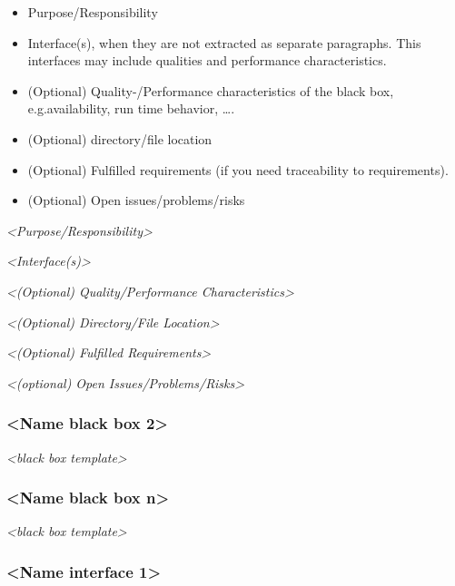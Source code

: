 \documentclass[
]{article}
\begin{document}
\begin{itemize}
\item
  Purpose/Responsibility
\item
  Interface(s), when they are not extracted as separate paragraphs. This
  interfaces may include qualities and performance characteristics.
\item
  (Optional) Quality-/Performance characteristics of the black box,
  e.g.availability, run time behavior, \ldots.
\item
  (Optional) directory/file location
\item
  (Optional) Fulfilled requirements (if you need traceability to
  requirements).
\item
  (Optional) Open issues/problems/risks
\end{itemize}

\emph{\textless Purpose/Responsibility\textgreater{}}

\emph{\textless Interface(s)\textgreater{}}

\emph{\textless(Optional) Quality/Performance
Characteristics\textgreater{}}

\emph{\textless(Optional) Directory/File Location\textgreater{}}

\emph{\textless(Optional) Fulfilled Requirements\textgreater{}}

\emph{\textless(optional) Open Issues/Problems/Risks\textgreater{}}

\hypertarget{__name_black_box_2}{%
\subsubsection{\textless Name black box
2\textgreater{}}\label{__name_black_box_2}}

\emph{\textless black box template\textgreater{}}

\hypertarget{__name_black_box_n}{%
\subsubsection{\textless Name black box
n\textgreater{}}\label{__name_black_box_n}}

\emph{\textless black box template\textgreater{}}

\hypertarget{__name_interface_1}{%
\subsubsection{\textless Name interface
1\textgreater{}}\label{__name_interface_1}}
\end{document}

